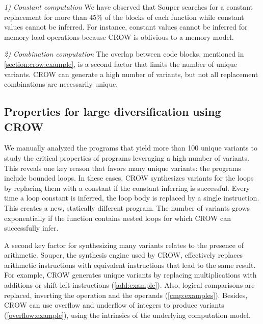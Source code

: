 \emph{1) Constant computation}  We have observed that Souper searches for a constant replacement for more than $45\%$ of the blocks of each function while constant values cannot be inferred. For instance,  constant values cannot be inferred for memory load operations because CROW is oblivious to a memory model. 


\emph{2) Combination computation}  The overlap between code blocks, mentioned in \autoref{section:crow:example}, is a second factor that limits the number of unique variants. CROW can generate a high number of variants, but not all replacement combinations are necessarily unique. 



\subsection{Properties for large diversification using CROW}

We manually analyzed the programs that yield more than 100 unique variants to study the critical properties of programs leveraging a high number of variants.
This reveals one key reason that favors many unique variants: the programs include bounded loops. In these cases, CROW synthesizes variants for the loops by replacing them with a constant if the constant inferring is successful. Every time a loop constant is inferred, the loop body is replaced by a single instruction. This creates a new, statically different program. The number of variants grows exponentially if the function contains nested loops for which CROW can successfully infer. 

A second key factor for synthesizing many variants relates to the presence of arithmetic. Souper, the synthesis engine used by CROW, effectively replaces arithmetic instructions with equivalent instructions that lead to the same result. For example, CROW generates unique variants by replacing multiplications with additions or shift left instructions (\autoref{add:example}). Also, logical comparisons are replaced, inverting the operation and the operands (\autoref{cmp:examples}). Besides, CROW can use overflow and underflow of integers to produce variants (\autoref{overflow:example}), using the intrinsics of the underlying computation model.

